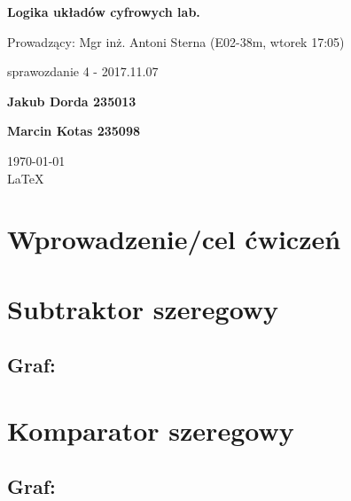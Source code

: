\documentclass[12pt,a4paper]{article}
\begin{document}
	
	\begin{titlepage}
		
		\centering
		{\huge\bfseries Logika układów cyfrowych lab.\par}
		
		\vspace{0.5cm}
		Prowadzący: Mgr inż. Antoni Sterna (E02-38m, wtorek 17:05) \\
	
		\vspace{1.1cm}
		{\Large sprawozdanie 4 - 2017.11.07\par}
		\vfill
		
		{\large\bfseries Jakub Dorda 235013\par}
		{\large\bfseries Marcin Kotas 235098\par}
		
		\vspace{1cm}
		\today \\ \LaTeX
		
		\restoregeometry
	\end{titlepage}

	\section{Wprowadzenie/cel ćwiczeń}
		
		
	\section{Subtraktor szeregowy}
	
		\subsection{Graf:}
		
			
	\section{Komparator szeregowy}
	
		\subsection{Graf:}
		
	
\end{document}
